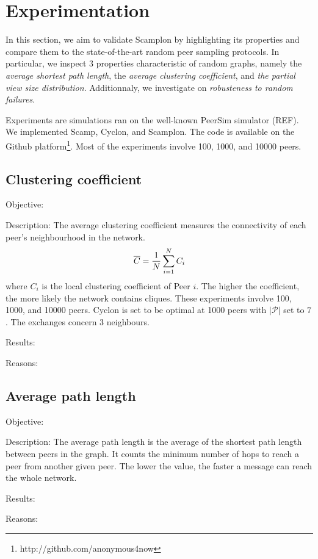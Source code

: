 
\section{Experimentation}
\label{sec:experiments}
In this section, we aim to validate Scamplon by highlighting its properties and
compare them to the state-of-the-art random peer sampling protocols. In
particular, we inspect 3 properties characteristic of random graphs, namely the
\emph{average shortest path length}, the \emph{average clustering coefficient},
and \emph{the partial view size distribution}. Additionnaly, we investigate on
\emph{robusteness to random failures}.

Experiments are simulations ran on the well-known PeerSim simulator (REF). We
implemented Scamp, Cyclon, and Scamplon. The code is available on the Github
platform\footnote{http://github.com/anonymous4now}. Most of the experiments
involve 100, 1000, and 10000 peers.

\subsection{Clustering coefficient}
\begin{asparadesc}
\item[Objective:]
\item[Description:] The average clustering coefficient measures the
  connectivity of each peer's neighbourhood in the network.
  \begin{equation}
    \overline{C} = {1\over N}\sum\limits_{i=1}^{N}C_i
    \end{equation}
    where $C_i$ is the local clustering coefficient of Peer $i$. The higher the
    coefficient, the more likely the network contains cliques. These
    experiments involve 100, 1000, and 10000 peers. Cyclon is set to be optimal
    at 1000 peers with $|\mathcal{P}|$ set to $7$. The exchanges concern $3$
    neighbours.
\item[Results:]
\item[Reasons:]
\end{asparadesc}

\subsection{Average path length}
\begin{asparadesc}
\item[Objective:]
\item[Description:] The average path length is the average of the shortest path
  length between peers in the graph. It counts the minimum number of hops to
  reach a peer from another given peer. The lower the value, the faster a
  message can reach the whole network.
\item[Results:]
\item[Reasons:]
\end{asparadesc}


